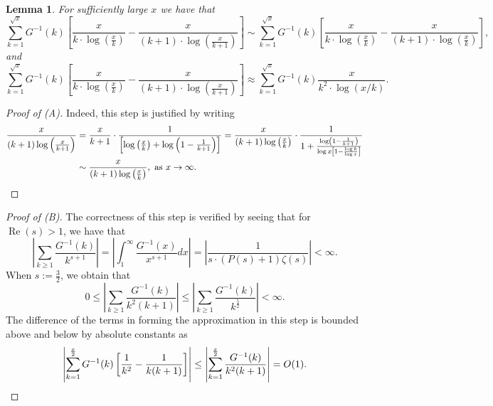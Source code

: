 \documentclass[11pt,reqno,a4letter]{article}
\numberwithin{figure}{section}
\numberwithin{table}{section}
\theoremstyle{plain}
\newtheorem{lemma}[theorem]{Lemma}
\numberwithin{theorem}{section}
\theoremstyle{definition}
\renewcommand{\Re}{\operatorname{Re}}
\begin{document}
\begin{lemma}
\label{lemma_PrimePix_ErrorBoundDiffs_SimplifyingConditions_v1} 
For sufficiently large $x$ we have that 
\begin{equation} 
\tag{A} 
\sum_{k=1}^{\sqrt{x}} G^{-1}(k)\left[\frac{x}{k \cdot \log\left(\frac{x}{k}\right)} - 
     \frac{x}{(k+1) \cdot \log\left(\frac{x}{k+1}\right)}\right] \sim 
     \sum_{k=1}^{\sqrt{x}} G^{-1}(k)\left[\frac{x}{k \cdot \log\left(\frac{x}{k}\right)} - 
     \frac{x}{(k+1) \cdot \log\left(\frac{x}{k}\right)}\right], 
\end{equation} 
and 
\begin{equation} 
\tag{B} 
\sum_{k=1}^{\sqrt{x}} G^{-1}(k)\left[\frac{x}{k \cdot \log\left(\frac{x}{k}\right)} - 
     \frac{x}{(k+1) \cdot \log\left(\frac{x}{k+1}\right)}\right] \approx 
     \sum_{k=1}^{\sqrt{x}} G^{-1}(k) \frac{x}{k^2 \cdot \log(x/k)}. 
\end{equation} 
\end{lemma} 
\begin{proof}[Proof of (A)] 
Indeed, this step is justified by writing 
\begin{align*} 
\frac{x}{(k+1) \log\left(\frac{x}{k+1}\right)} & = \frac{x}{k+1} \cdot 
     \frac{1}{\left[\log\left(\frac{x}{k}\right) + \log\left(1 - \frac{1}{k+1}\right)\right]} 
     = \frac{x}{(k+1) \log\left(\frac{x}{k}\right)} \cdot 
     \frac{1}{1 + \frac{\log\left(1 - \frac{1}{k+1}\right)}{\log x \left[ 
     1 - \frac{\log k}{\log x}\right]}} \\ 
     & \sim \frac{x}{(k+1) \log\left(\frac{x}{k}\right)}, \mathrm{\ as\ } x \rightarrow \infty. 
     \qedhere 
\end{align*} 
\end{proof} 
\begin{proof}[Proof of (B)] 
The correctness of this step is 
verified by seeing that for $\Re(s) > 1$, we have that 
\[
\left\lvert \sum_{k \geq 1} \frac{G^{-1}(k)}{k^{s+1}} \right\rvert = 
      \left\lvert \int_1^{\infty} \frac{G^{-1}(x)}{x^{s+1}} dx \right\rvert = 
      \left\lvert \frac{1}{s \cdot (P(s) + 1) \zeta(s)} \right\rvert < 
      \infty. 
\]
When $s := \frac{3}{2}$, we obtain that 
\[
0 \leq \left\lvert \sum_{k \geq 1} \frac{G^{-1}(k)}{k^{2} (k+1)} \right\rvert \leq 
     \left\lvert \sum_{k \geq 1} \frac{G^{-1}(k)}{k^{\frac{5}{2}}} \right\rvert < \infty. 
\]
The difference of the terms in forming the approximation in this step 
is bounded above and below by absolute constants as 
\[
\left\lvert \sum_{k=1}^{\frac{x}{2}} G^{-1}(k) \left[\frac{1}{k^2} - \frac{1}{k(k+1)}\right] \right\rvert \leq 
     \left\lvert\sum_{k=1}^{\frac{x}{2}} \frac{G^{-1}(k)}{k^2 (k+1)} \right\rvert = O(1). 
     \qedhere
\]
\end{proof} 
\end{document}
